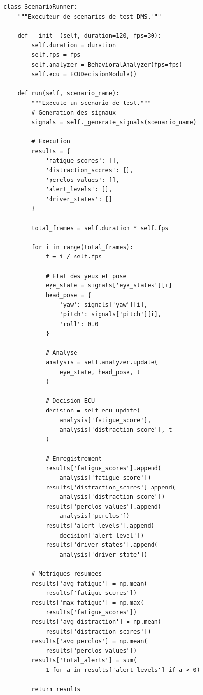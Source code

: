 \documentclass[12pt,a4paper,twoside]{report}
\begin{document}
\begin{lstlisting}[style=pythonstyle, caption={Extrait du module de scénarios de test.}, label={lst:scenarios}]
class ScenarioRunner:
    """Executeur de scenarios de test DMS."""
    
    def __init__(self, duration=120, fps=30):
        self.duration = duration
        self.fps = fps
        self.analyzer = BehavioralAnalyzer(fps=fps)
        self.ecu = ECUDecisionModule()
    
    def run(self, scenario_name):
        """Execute un scenario de test."""
        # Generation des signaux
        signals = self._generate_signals(scenario_name)
        
        # Execution
        results = {
            'fatigue_scores': [],
            'distraction_scores': [],
            'perclos_values': [],
            'alert_levels': [],
            'driver_states': []
        }
        
        total_frames = self.duration * self.fps
        
        for i in range(total_frames):
            t = i / self.fps
            
            # Etat des yeux et pose
            eye_state = signals['eye_states'][i]
            head_pose = {
                'yaw': signals['yaw'][i],
                'pitch': signals['pitch'][i],
                'roll': 0.0
            }
            
            # Analyse
            analysis = self.analyzer.update(
                eye_state, head_pose, t
            )
            
            # Decision ECU
            decision = self.ecu.update(
                analysis['fatigue_score'],
                analysis['distraction_score'], t
            )
            
            # Enregistrement
            results['fatigue_scores'].append(
                analysis['fatigue_score'])
            results['distraction_scores'].append(
                analysis['distraction_score'])
            results['perclos_values'].append(
                analysis['perclos'])
            results['alert_levels'].append(
                decision['alert_level'])
            results['driver_states'].append(
                analysis['driver_state'])
        
        # Metriques resumees
        results['avg_fatigue'] = np.mean(
            results['fatigue_scores'])
        results['max_fatigue'] = np.max(
            results['fatigue_scores'])
        results['avg_distraction'] = np.mean(
            results['distraction_scores'])
        results['avg_perclos'] = np.mean(
            results['perclos_values'])
        results['total_alerts'] = sum(
            1 for a in results['alert_levels'] if a > 0)
        
        return results
\end{lstlisting}
\end{document}
